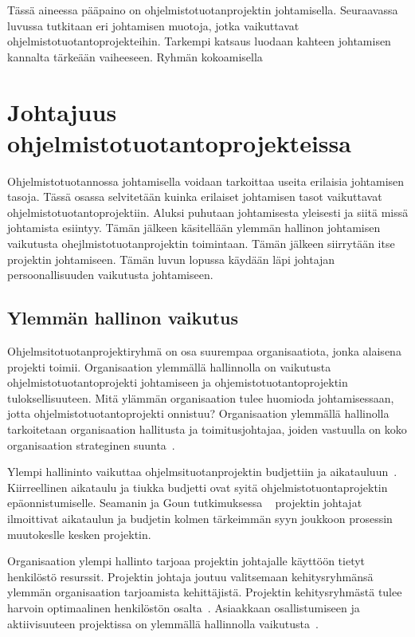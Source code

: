 \documentclass[finnish]{tktltiki2}
\theoremstyle{definition}
\theoremstyle{remark}
\begin{document}
Tässä aineessa pääpaino on ohjelmistotuotanprojektin johtamisella. Seuraavassa luvussa tutkitaan eri johtamisen muotoja, jotka vaikuttavat ohjelmistotuotantoprojekteihin. Tarkempi katsaus luodaan kahteen johtamisen kannalta tärkeään vaiheeseen. Ryhmän kokoamisella 


  


\section{Johtajuus ohjelmistotuotantoprojekteissa}

Ohjelmistotuotannossa johtamisella voidaan tarkoittaa useita erilaisia johtamisen tasoja. Tässä osassa selvitetään kuinka erilaiset johtamisen tasot vaikuttavat ohjelmistotuotantoprojektiin. Aluksi puhutaan johtamisesta yleisesti ja siitä missä johtamista esiintyy. Tämän jälkeen käsitellään ylemmän hallinon johtamisen vaikutusta ohejlmistotuotanprojektin toimintaan. Tämän jälkeen siirrytään itse projektin johtamiseen. Tämän luvun lopussa käydään läpi johtajan persoonallisuuden vaikutusta johtamiseen.


\subsection{Ylemmän hallinon vaikutus}

Ohjelmsitotuotanprojektiryhmä on osa suurempaa organisaatiota, jonka alaisena projekti toimii. Organisaation ylemmällä hallinnolla on vaikutusta ohjelmistotuotantoprojekti johtamiseen ja ohjemistotuotantoprojektin tuloksellisuuteen. Mitä ylämmän organisaation tulee huomioda johtamisessaan, jotta ohjelmistotuotantoprojekti onnistuu? Organisaation ylemmällä hallinolla tarkoitetaan organisaation hallitusta ja toimitusjohtajaa, joiden vastuulla on koko organisaation strateginen suunta~\cite{McLeod:2011:FAS:1978802.1978803}.

Ylempi hallininto vaikuttaa ohjelmsituotanprojektin budjettiin ja aikatauluun~\cite{McLeod:2011:FAS:1978802.1978803}. Kiirreellinen aikataulu ja tiukka budjetti ovat syitä ohjelmistotuontaprojektin epäonnistumiselle. Seamanin ja Goun tutkimuksessa ~\cite{Guo:2008:SSP:1414004.1414046} projektin johtajat ilmoittivat aikataulun ja budjetin kolmen tärkeimmän syyn joukkoon prosessin muutokeslle kesken projektin. 

Organisaation ylempi hallinto tarjoaa projektin johtajalle käyttöön tietyt henkilöstö resurssit. Projektin johtaja joutuu valitsemaan kehitysryhmänsä ylemmän organisaation tarjoamista kehittäjistä. Projektin kehitysryhmästä tulee harvoin optimaalinen henkilöstön osalta~\cite{Dhomne:2012:ITL:2382887.2382899}. Asiaakkaan osallistumiseen ja aktiivisuuteen projektissa on ylemmällä hallinnolla vaikutusta~\cite{McLeod:2011:FAS:1978802.1978803}.
\end{document}
